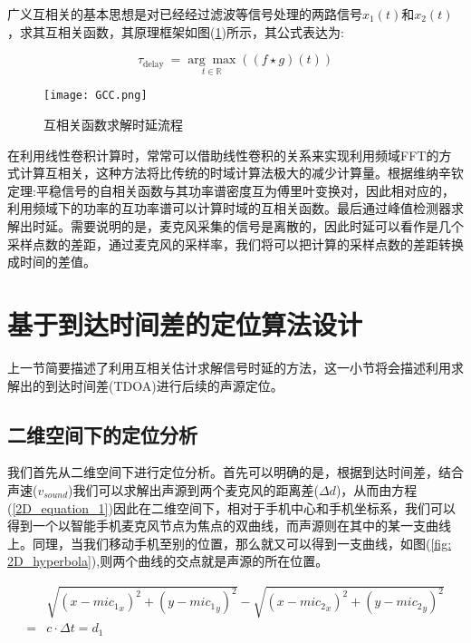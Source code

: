 \documentclass[winfonts,oneside]{njuthesis}
\begin{document}
		广义互相关的基本思想是对已经经过滤波等信号处理的两路信号$x_1(t)$和$x_2(t)$，求其互相关函数，其原理框架如图(\ref{fig: GCC})所示，其公式表达为:
		
		\begin{equation}
		\tau_{\text {delay }}=\underset{t \in \mathbb{R}}{\arg \max }((f \star g)(t))
		\end{equation}
		
		\begin{figure}[H]
			\centering
			\texttt{[image: GCC.png]} 
			\caption{互相关函数求解时延流程}
			\label{fig: GCC}
		\end{figure}	
		
		在利用线性卷积计算时，常常可以借助线性卷积的关系来实现利用频域FFT的方式计算互相关，这种方法将比传统的时域计算法极大的减少计算量。根据维纳辛钦定理:平稳信号的自相关函数与其功率谱密度互为傅里叶变换对，因此相对应的，利用频域下的功率的互功率谱可以计算时域的互相关函数。最后通过峰值检测器求解出时延。需要说明的是，麦克风采集的信号是离散的，因此时延可以看作是几个采样点数的差距，通过麦克风的采样率，我们将可以把计算的采样点数的差距转换成时间的差值。
	
	\section{基于到达时间差的定位算法设计}
	
		上一节简要描述了利用互相关估计求解信号时延的方法，这一小节将会描述利用求解出的到达时间差(TDOA)进行后续的声源定位。
		
		\subsection{二维空间下的定位分析}
		
		我们首先从二维空间下进行定位分析。首先可以明确的是，根据到达时间差，结合声速($v_{sound}$)我们可以求解出声源到两个麦克风的距离差($\Delta d$)，从而由方程(\ref{2D_equation_1})因此在二维空间下，相对于手机中心和手机坐标系，我们可以得到一个以智能手机麦克风节点为焦点的双曲线，而声源则在其中的某一支曲线上。同理，当我们移动手机至别的位置，那么就又可以得到一支曲线，如图(\ref{fig: 2D_hyperbola}),则两个曲线的交点就是声源的所在位置。
		
		\begin{equation}
		\begin{aligned}
			&\sqrt{(x-{mic_1}_x)^2+(y-{mic_1}_y)^2} - \sqrt{(x-{mic_2}_x)^2+(y-{mic_2}_y)^2}\\
		  = & c \cdot \Delta t= d_1 \label{2D_equation_1}
		\end{aligned}
		\end{equation}
		
\end{document}
